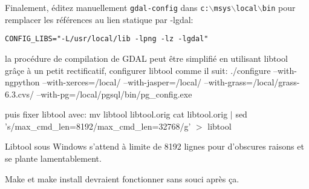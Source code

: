 % 
% 
% 
% 

Finalement, éditez manuellement \texttt{gdal-config} dans \texttt{c:$\backslash$msys$\backslash$local$\backslash$bin} pour remplacer les références au lien statique par -lgdal:

\begin{verbatim}
CONFIG_LIBS="-L/usr/local/lib -lpng -lz -lgdal"
\end{verbatim}
la procédure de compilation de GDAL peut être simplifié en utilisant libtool grâçe à un petit rectificatif, configurer libtool comme il suit:
./configure --with-ngpython --with-xerces=/local/ --with-jasper=/local/
--with-grass=/local/grass-6.3.cvs/ --with-pg=/local/pgsql/bin/pg\_config.exe 

puis fixer libtool avec:
mv libtool libtool.orig
cat libtool.orig $|$ sed 's/max\_cmd\_len=8192/max\_cmd\_len=32768/g' $>$
libtool

Libtool sous Windows s'attend à limite de 8192 lignes pour d'obscures raisons et se plante lamentablement. 

Make et make install devraient fonctionner sans souci après ça.

% 
% 
% 

